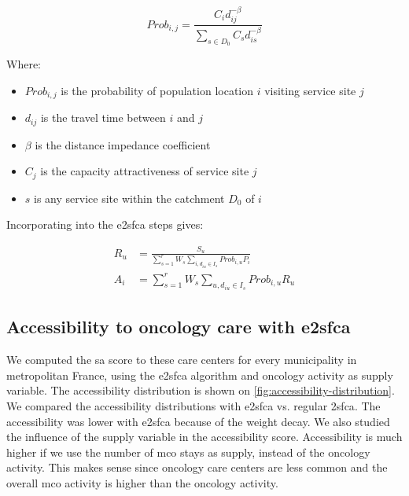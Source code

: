 
\begin{equation}
    Prob_{i,j} = \frac{C_i d_{ij}^{-\beta}}{\sum_{s \in D_0} C_s d_{is}^{-\beta}}
\end{equation}

Where:

\begin{itemize}
    \item $Prob_{i,j}$ is the probability of population location $i$ visiting
          service site $j$
    \item $d_{ij}$ is the travel time between $i$ and $j$
    \item $\beta$ is the distance impedance coefficient
    \item $C_j$ is the capacity \/ attractiveness of service site $j$
    \item $s$ is any service site within the catchment $D_0$ of $i$
\end{itemize}

Incorporating into the \ac{e2sfca} steps gives:

\begin{align}
    R_u & =  \frac{S_u}{\sum_{s=1}^{r} W_s \sum_{i, d_{iu} \in I_s} Prob_{i,u} P_i} \\
    A_i & = \sum_{s=1}^{r} W_s \sum_{u, d_{iu} \in I_s} Prob_{i,u} R_u
\end{align}

\subsection{Accessibility to oncology care with \ac{e2sfca}}

We computed the \ac{sa} score to these care centers for every municipality in
metropolitan France, using the \ac{e2sfca} algorithm and oncology activity as
supply variable. The accessibility distribution is shown on
\cref{fig:accessibility-distribution}. We compared the accessibility
distributions with \ac{e2sfca} vs. regular \ac{2sfca}. The accessibility was
lower with \ac{e2sfca} because of the weight decay. We also studied the
influence of the supply variable in the accessibility score. Accessibility is
much higher if we use the number of \ac{mco} stays as supply, instead of the
oncology activity. This makes sense since oncology care centers are less common
and the overall \ac{mco} activity is higher than the oncology activity.


